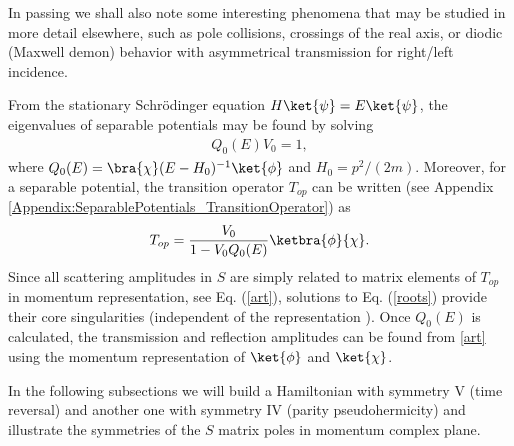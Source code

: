In passing we shall also note some interesting phenomena that may be studied in more detail elsewhere, such as pole collisions, crossings of
the real axis, or diodic (Maxwell demon) behavior with asymmetrical transmission for right/left incidence.

From the stationary Schr\"{o}dinger equation $H \ket{\psi} = E \ket{\psi}$, the eigenvalues of separable potentials may be found by solving
%
\begin{eqnarray}
	Q_{0}(E)V_{0} = 1,
	\label{roots}
\end{eqnarray}
%
where $Q_{0}(E)=\bra{\chi}(E-H_0)^{-1}\ket{\phi}$ and $H_{0}=p^{2}/(2m)$. Moreover, for a separable potential, the transition operator $T_{op}$ can be written (see Appendix \ref{Appendix:SeparablePotentials_TransitionOperator}) as
%
\begin{equation}
	T_{op}=\frac{V_{0}}{1-V_{0} Q_{0}(E)} \ketbra{\phi}{\chi}.
\end{equation}
%
Since all scattering amplitudes in $S$ are simply related to matrix elements of $T_{op}$ in momentum representation, see
Eq. (\ref{art}), solutions to Eq. (\ref{roots}) provide their core singularities (independent of the representation \cite{Muga1996}).
Once $Q_{0}(E)$  is calculated, the transmission and reflection amplitudes can be found from \eqref{art}
using the momentum representation of $\ket{\phi}$ and $\ket{\chi}$.

In the following subsections we will build a Hamiltonian with symmetry V (time reversal) and another one with symmetry IV
(parity pseudohermicity) and illustrate the symmetries of the $S$ matrix poles in momentum complex plane.

%
